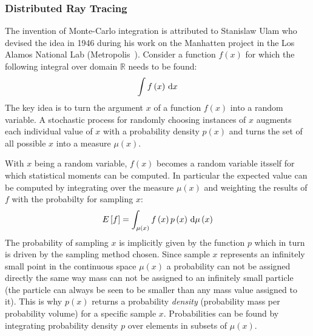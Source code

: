 \subsubsection*{Distributed Ray Tracing}

The invention of Monte-Carlo integration is attributed to Stanislaw Ulam who devised the idea in 1946 during his work on the Manhatten project in the Los Alamos National Lab (Metropolis~\cite{Metropolis49, Metropolis87}). Consider a function $f\left(x\right)$ for which the following integral over domain $\mathbb{R}$ needs to be found:
\begin{align}
\int f\left(x\right)\,\mathrm{d} x
\label{eq:mc_integral_1}
\end{align}
The key idea is to turn the argument $x$ of a function $f(x)$ into a random variable. A stochastic process for randomly choosing instances of $x$ augments each individual value of $x$ with a probability density $p(x)$ and turns the set of all possible $x$ into a measure $\mu(x)$.

With $x$ being a random variable, $f\left(x\right)$ becomes a random variable itsself for which statistical moments can be computed. In particular the expected value can be computed by integrating over the measure $\mu(x)$ and weighting the results of $f$ with the probabilty for sampling $x$:
\begin{align}
E\left[f\right] = \int_{\mu\left(x\right)} f\left(x\right)p\left(x\right)\,\mathrm{d}\mu\left(x\right)
\end{align}
The probability of sampling $x$ is implicitly given by the function $p$ which in turn is driven by the sampling method chosen. Since sample $x$ represents an infinitely small point in the continuous space $\mu\left(x\right)$ a probability can not be assigned directly the same way mass can not be assigned to an infinitely small particle (the particle can always be seen to be smaller than any mass value assigned to it). This is why $p(x)$ returns a probability \emph{density} (probability mass per probability volume) for a specific sample $x$. Probabilities can be found by integrating probability density $p$ over elements in subsets of $\mu\left(x\right)$.

